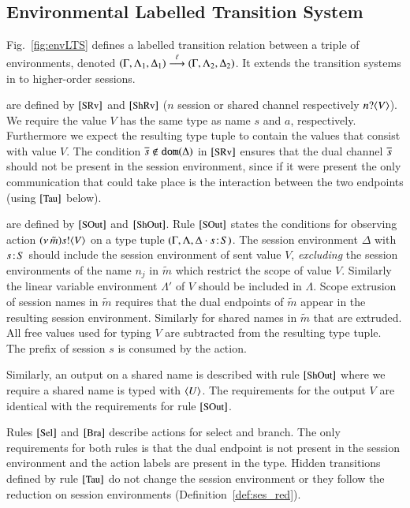 \subsection{Environmental Labelled Transition System}
\label{ss:elts}
\noi 
Fig.~\ref{fig:envLTS}
defines a labelled transition relation between 
a triple of environments, 
denoted
$(\Gamma, \Lambda_1, \Delta_1) \stackrel{\ell}{\longrightarrow} (\Gamma, \Lambda_2, \Delta_2)$.
It extends the transition systems
in \cite{DBLP:conf/forte/KouzapasYH11,KY13,dkphdthesis} 
to higher-order sessions. 

are defined by 
$\eltsrule{SRv}$ and $\eltsrule{ShRv}$
($n$ session or shared channel respectively $n ? \langle V \rangle$). 
We require the value $V$ has
the same type as name $s$ and $a$, respectively.  Furthermore we
expect the resulting type tuple to contain the values that consist
with value $V$. The condition $\overline{s} \notin \mathtt{dom}(\Delta)$
in $\eltsrule{SRv}$ ensures that 
the dual channel $\overline{s}$ should not be
present in the session environment, since if it were present
the only communication that could take place is the interaction
between the two endpoints (using $\eltsrule{Tau}$ below).

 are defined by $\eltsrule{SOut}$
and $\eltsrule{ShOut}$.  
Rule $\eltsrule{SOut}$ states the conditions for observing action
$(\nu\, \tilde{m}) s ! \langle V \rangle$ on a type tuple 
$(\Gamma, \Lambda, \Delta\cdot s \! : \! S)$. 
The session environment $\Delta$ with $s \! : \! S$ 
should include the session environment of sent value $V$, 
{\em excluding} the session environments of the name $n_j$ 
in $\tilde{m}$ which restrict the scope of value $V$. 
Similarly the linear variable environment 
$\Lambda'$ of $V$ should be included in $\Lambda$. 
Scope extrusion of session names in $\tilde{m}$ requires
that the dual endpoints of $\tilde{m}$ appear in
the resulting session environment. Similarly for shared 
names in $\tilde{m}$ that are extruded.  
All free values used for typing $V$ are subtracted from the
resulting type tuple. The prefix of session $s$ is consumed
by the action.

Similarly, an output on a shared name is described
with rule $\eltsrule{ShOut}$ where we require a shared name
is typed with $\langle U \rangle$. The requirements for
the output $V$ are identical with the requirements for
rule $\eltsrule{SOut}$.

Rules $\eltsrule{Sel}$ and $\eltsrule{Bra}$ describe actions for
select and branch. The only requirements for both
rules is that the dual endpoint is not present in the session
environment and the action labels are present
in the type.
Hidden transitions defined by rule $\eltsrule{Tau}$ 
do not change the session environment or they follow the reduction on session
environments (Definition~\ref{def:ses_red}). 


